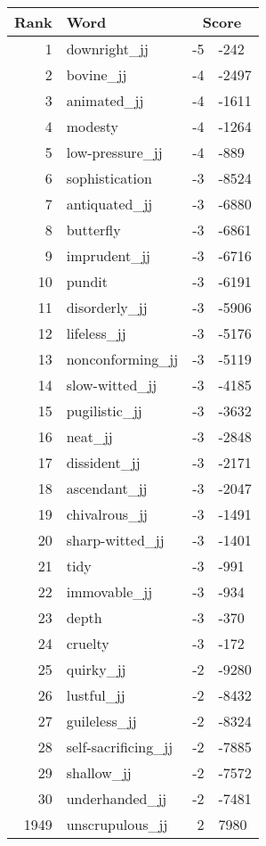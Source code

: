 \begin{longtable}[!htbp]{| rlr@{.}l |}
    \hline
    \textbf{Rank} & \textbf{Word} & \multicolumn{2}{c|}{\textbf{Score}} \\
    \hline
    \endhead
    1 & downright\_jj & -5 & -242 \\
    2 & bovine\_jj & -4 & -2497 \\
    3 & animated\_jj & -4 & -1611 \\
    4 & modesty & -4 & -1264 \\
    5 & low-pressure\_jj & -4 & -889 \\
    6 & sophistication & -3 & -8524 \\
    7 & antiquated\_jj & -3 & -6880 \\
    8 & butterfly & -3 & -6861 \\
    9 & imprudent\_jj & -3 & -6716 \\
    10 & pundit & -3 & -6191 \\
    11 & disorderly\_jj & -3 & -5906 \\
    12 & lifeless\_jj & -3 & -5176 \\
    13 & nonconforming\_jj & -3 & -5119 \\
    14 & slow-witted\_jj & -3 & -4185 \\
    15 & pugilistic\_jj & -3 & -3632 \\
    16 & neat\_jj & -3 & -2848 \\
    17 & dissident\_jj & -3 & -2171 \\
    18 & ascendant\_jj & -3 & -2047 \\
    19 & chivalrous\_jj & -3 & -1491 \\
    20 & sharp-witted\_jj & -3 & -1401 \\
    21 & tidy & -3 & -991 \\
    22 & immovable\_jj & -3 & -934 \\
    23 & depth & -3 & -370 \\
    24 & cruelty & -3 & -172 \\
    25 & quirky\_jj & -2 & -9280 \\
    26 & lustful\_jj & -2 & -8432 \\
    27 & guileless\_jj & -2 & -8324 \\
    28 & self-sacrificing\_jj & -2 & -7885 \\
    29 & shallow\_jj & -2 & -7572 \\
    30 & underhanded\_jj & -2 & -7481 \\
    1949 & unscrupulous\_jj & 2 & 7980 \\

\end{longtable}
